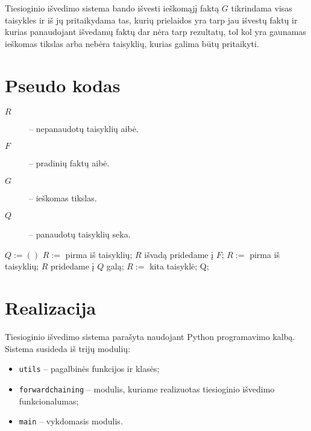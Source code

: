 Tiesioginio išvedimo sistema bando išvesti ieškomąjį faktą $G$
tikrindama visas taisykles ir iš jų pritaikydama tas, kurių
prielaidos yra tarp jau išvestų faktų ir kurias panaudojant išvedamų
faktų dar nėra tarp rezultatų, tol kol yra gaunamas ieškomas tikslas
arba nebėra taisyklių, kurias galima būtų pritaikyti.

\section{Pseudo kodas}

\label{sec:fc:pseudo}

\begin{description}
  \item[$R$] – nepanaudotų taisyklių aibė.
  \item[$F$] – pradinių faktų aibė.
  \item[$G$] – ieškomas tikslas.
  \item[$Q$] – panaudotų taisyklių seka.
\end{description}
\begin{algorithmic}[1]
    \State $Q := \left(  \right)$
    \State $R :=$ pirma iš taisyklių;
                                        \label{fc:pseudo:while_condition}
                                        \label{fc:pseudo:if_condition}
        \State $R$ išvadą pridedame į $F$;
                                        \label{fc:pseudo:add_fact}
        \State $R := $ pirma iš taisyklių;
                                        \label{fc:pseudo:start}
        \State $R$ pridedame į $Q$ galą;
                                        \label{fc:pseudo:add_rule}
      \Else
        \State $R := $ kita taisyklė;   \label{fc:pseudo:next_rule}
      \EndIf
    \EndWhile
    \State \Return Q;
  \EndFunction
\end{algorithmic}

\section{Realizacija}

Tiesioginio išvedimo sistema parašyta naudojant Python programavimo
kalbą. Sistema susideda iš trijų modulių:
\begin{itemize}
  \item \verb|utils| – pagalbinės funkcijos ir klasės;
  \item \verb|forwardchaining| – modulis, kuriame realizuotas
    tiesioginio išvedimo funkcionalumas;
  \item \verb|main| – vykdomasis modulis.
\end{itemize}

